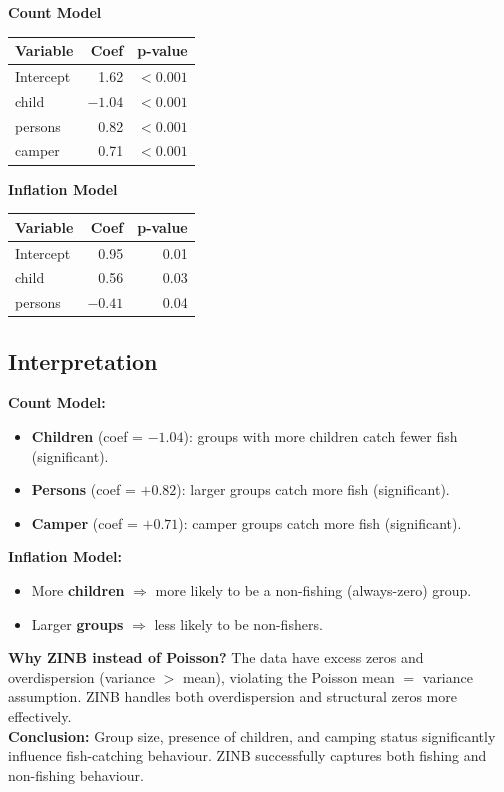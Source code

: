 \documentclass[12pt,a4paper]{article}
\begin{document}
\begin{outputbox}
\textbf{Count Model}
\begin{center}
\begin{tabular}{lrr}
\toprule
Variable  & Coef    & p-value  \\
\midrule
Intercept & 1.62    & $<0.001$ \\
child     & $-1.04$ & $<0.001$ \\
persons   & 0.82    & $<0.001$ \\
camper    & 0.71    & $<0.001$ \\
\bottomrule
\end{tabular}
\end{center}

\textbf{Inflation Model}
\begin{center}
\begin{tabular}{lrr}
\toprule
Variable  & Coef    & p-value \\
\midrule
Intercept & 0.95    & 0.01    \\
child     & 0.56    & 0.03    \\
persons   & $-0.41$ & 0.04    \\
\bottomrule
\end{tabular}
\end{center}
\end{outputbox}

\subsection{Interpretation}

\begin{interpbox}
\textbf{Count Model:}
\begin{itemize}[noitemsep]
  \item \textbf{Children} (coef = $-1.04$): groups with more children catch fewer fish (significant).
  \item \textbf{Persons} (coef = $+0.82$): larger groups catch more fish (significant).
  \item \textbf{Camper} (coef = $+0.71$): camper groups catch more fish (significant).
\end{itemize}
\textbf{Inflation Model:}
\begin{itemize}[noitemsep]
  \item More \textbf{children} $\Rightarrow$ more likely to be a non-fishing (always-zero) group.
  \item Larger \textbf{groups} $\Rightarrow$ less likely to be non-fishers.
\end{itemize}
\textbf{Why ZINB instead of Poisson?} The data have excess zeros and overdispersion (variance $>$ mean), violating the Poisson mean $=$ variance assumption. ZINB handles both overdispersion and structural zeros more effectively.\\[4pt]
\textbf{Conclusion:} Group size, presence of children, and camping status significantly influence fish-catching behaviour. ZINB successfully captures both fishing and non-fishing behaviour.
\end{interpbox}
\end{document}
